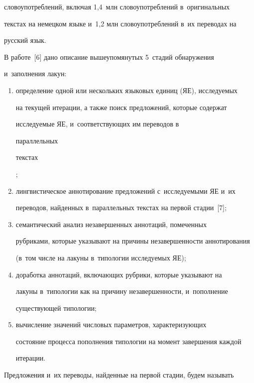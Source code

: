 словоупотреблений, включая 1,4~млн словоупотреблений в~оригинальных 


текстах на немецком языке и~1,2 млн словоупотреблений в~их переводах на 


русский язык.


  


  В работе~[6] дано описание вышеупомянутых 5~стадий обнаружения 


и~заполнения лакун:


  \begin{enumerate}[(1)]


\item определение одной или нескольких языковых единиц (ЯЕ), исследуемых 


на текущей итерации, а также поиск предложений, которые содержат 


ис\-сле\-ду\-емые ЯЕ, и~соответствующих им переводов в~{параллельных 


текстах};


  \item  лингвистическое аннотирование предложений с~исследуемыми ЯЕ и~их 


переводов, найденных в~параллельных текстах на первой стадии~[7];


  \item семантический анализ незавершенных аннотаций, помеченных 


рубриками, которые указывают на причины незавершенности аннотирования 


(в~том числе на лакуны в~типологии исследуемых ЯЕ);


  \item доработка аннотаций, включающих рубрики, которые указывают на 


лакуны в~типологии как на причину незавершенности, и~пополнение 


существующей типологии;


  \item вычисление значений числовых параметров, характеризующих 


состояние процесса пополнения типологии на момент завершения каждой 


итерации.


  \end{enumerate}


  


  Предложения и~их переводы, найденные на первой стадии, будем называть 


